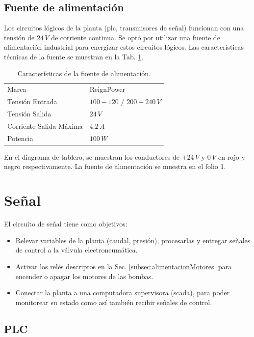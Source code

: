 \subsection{Fuente de alimentación}
\label{subsec:fuenteAlim}
Los circuitos lógicos de la planta (\gls{plc}, transmisores de señal) funcionan con una
tensión de $24\,V$ de corriente continua.
Se optó por utilizar una fuente de alimentación industrial para energizar estos
circuitos lógicos.
Las características técnicas de la fuente se muestran en la Tab.
\ref{tab:fuenteAlim}.
\begin{table}[h]
\renewcommand{\arraystretch}{1.3}
\centering
\begin{tabular}{|l|l|}
\hline
Marca & ReignPower\\
Tensión Entrada& $100-120$ / $200-240\,V$\\
Tensión Salida& $24\,V$\\
Corriente Salida Máxima& $4.2\,A$\\
Potencia & $100\,W$\\
\hline
\end{tabular}
\caption{Características de la fuente de alimentación.}
\label{tab:fuenteAlim}
\end{table}

En el diagrama de tablero, se muestran los conductores de $+24\,V$ y $0\,V$ en
rojo y negro respectivamente.
La fuente de alimentación se muestra en el folio 1.

\section{Señal}
\label{sec:Senal}

El circuito de señal tiene como objetivos:
\begin{itemize}
 \item Relevar variables de la planta (caudal, presión), procesarlas y entregar
señales de control a la válvula electroneumática.
\item Activar los relés descriptos en la Sec.
\ref{subsec:alimentacionMotores} para encender o apagar los motores de las
bombas.
\item Conectar la planta a una computadora supervisora (\gls{scada}), para poder
monitorear su estado como así también recibir señales de control.
\end{itemize}

\subsection{PLC}
\label{subsec:plc}

